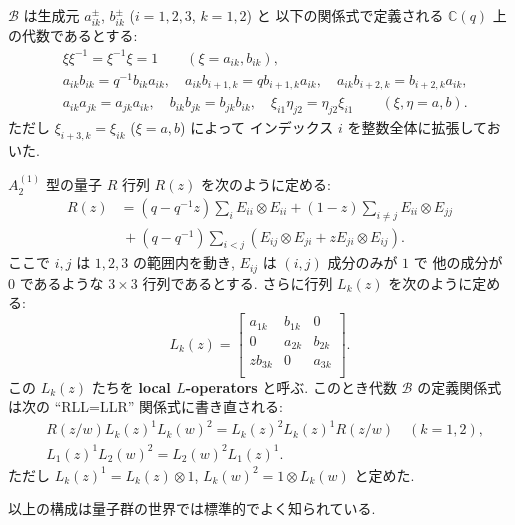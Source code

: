 \documentclass[12pt,twoside,dvipdfm]{msjproc}
\newcommand\C{{\mathbb C}} %
\theoremstyle{definition} %
\theoremstyle{definition} %
\theoremstyle{definition} %
\numberwithin{theorem}{section}
\numberwithin{equation}{section}
\numberwithin{figure}{section}
\numberwithin{table}{section}
\newcommand\B{\mathcal{B}}
\begin{document}
$\B$ は生成元 $a_{ik}^\pm$, $b_{ik}^\pm$ ($i=1,2,3$, $k=1,2$) と
以下の関係式で定義される $\C(q)$ 上の代数であるとする:
\begin{align*}
 &
 \xi \xi^{-1} = \xi^{-1} \xi = 1
 \qquad (\xi=a_{ik},b_{ik}),
 \\ &
 a_{ik} b_{ik} = q^{-1} b_{ik} a_{ik}, \quad
 a_{ik} b_{i+1,k} = q b_{i+1,k} a_{ik}, \quad
 a_{ik} b_{i+2,k} = b_{i+2,k} a_{ik}, 
 \\ &
 a_{ik} a_{jk} = a_{jk} a_{ik}, \quad
 b_{ik} b_{jk} = b_{jk} b_{ik}, \quad
 \xi_{i1} \eta_{j2} = \eta_{j2} \xi_{i1} \qquad (\xi,\eta=a,b).
\end{align*}
ただし $\xi_{i+3,k}=\xi_{ik}$ ($\xi=a,b$) によって
インデックス $i$ を整数全体に拡張しておいた.

$A^{(1)}_2$ 型の量子 $R$ 行列 $R(z)$ を次のように定める:
\begin{align*}
 R(z)
 & = (q-q^{-1}z) \sum_i E_{ii}\otimes E_{ii}
 + (1-z)       \sum_{i\ne j} E_{ii}\otimes E_{jj}
 \\ & \,
 + (q-q^{-1})  \sum_{i<j} (E_{ij}\otimes E_{ji} + z E_{ji}\otimes E_{ij}).
\end{align*}
ここで $i,j$ は $1,2,3$ の範囲内を動き, $E_{ij}$ は $(i,j)$ 成分のみが $1$ で
他の成分が $0$ であるような $3\times 3$ 行列であるとする. 
さらに行列 $L_k(z)$ を次のように定める:
\begin{equation*}
 L_k(z) =
 \begin{bmatrix}
    a_{1k} & b_{1k} & 0 \\
    0 & a_{2k} & b_{2k} \\
  z b_{3k} & 0 & a_{3k} \\
 \end{bmatrix}.
\end{equation*}
この $L_k(z)$ たちを {\bf local $L$-operators} と呼ぶ.
このとき代数 $\B$ の定義関係式は次の ``RLL=LLR'' 関係式に書き直される:
\begin{align*}
 &
 R(z/w)L_k(z)^1 L_k(w)^2 = L_k(z)^2 L_k(z)^1 R(z/w)  \quad (k=1,2), 
 \\ &
 L_1(z)^1 L_2(w)^2 = L_2(w)^2 L_1(z)^1.
\end{align*}
ただし $L_k(z)^1=L_k(z)\otimes 1$, $L_k(w)^2=1\otimes L_k(w)$ と定めた.

以上の構成は量子群の世界では標準的でよく知られている.
\end{document}
